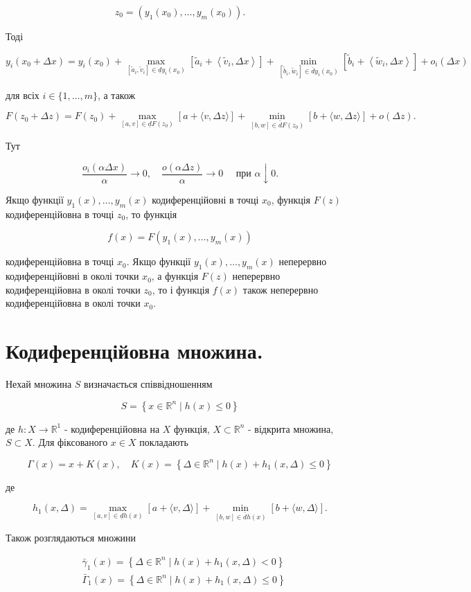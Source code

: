 \documentclass[10pt]{article}
\begin{document}
$$
z_{0}=\left(y_{1}\left(x_{0}\right), \ldots, y_{m}\left(x_{0}\right)\right) .
$$

Тоді

$$
y_{i}\left(x_{0}+\Delta x\right)=y_{i}\left(x_{0}\right)+\max _{\left[\widetilde{a}_{i}, \widetilde{v}_{i}\right] \in \underline{d} y_{i}\left(x_{0}\right)}\left[\widetilde{a}_{i}+\left\langle\widetilde{v}_{i}, \Delta x\right\rangle\right]+\min _{\left[\widetilde{b}_{i}, \widetilde{w}_{i}\right] \in \bar{d} y_{i}\left(x_{0}\right)}\left[\widetilde{b}_{i}+\left\langle\widetilde{w}_{i}, \Delta x\right\rangle\right]+o_{i}(\Delta x)
$$

для всіх $i \in\{1, \ldots, m\}$, а також

$$
F\left(z_{0}+\Delta z\right)=F\left(z_{0}\right)+\max _{[a, v] \in \underline{d} F\left(z_{0}\right)}[a+\langle v, \Delta z\rangle]+\min _{[b, w] \in \bar{d} F\left(z_{0}\right)}[b+\langle w, \Delta z\rangle]+o(\Delta z) .
$$

Тут

$$
\frac{o_{i}(\alpha \Delta x)}{\alpha} \rightarrow 0, \quad \frac{o(\alpha \Delta z)}{\alpha} \rightarrow 0 \quad \text { при } \alpha \downarrow 0 .
$$

Якщо функції $y_{1}(x), \ldots, y_{m}(x)$ кодиференційовні в точці $x_{0}$, функція $F(z)$ кодиференційовна в точці $z_{0}$, то функція

$$
f(x)=F\left(y_{1}(x), \ldots, y_{m}(x)\right)
$$

кодиференційовна в точці $x_{0}$. Якщо функції $y_{1}(x), \ldots, y_{m}(x)$ неперервно кодиференційовні в околі точки $x_{0}$, а функція $F(z)$ неперервно кодиференційовна в околі точки $z_{0}$, то і функція $f(x)$ також неперервно кодиференційовна в околі точки $x_{0}$.

\section*{Кодиференційовна множина.}
Нехай множина $S$ визначається співвідношенням

$$
S=\left\{x \in \mathbb{R}^{n} \mid h(x) \leq 0\right\}
$$

де $h: X \rightarrow \mathbb{R}^{1}$ - кодиференційовна на $X$ функція, $X \subset \mathbb{R}^{n}$ - відкрита множина, $S \subset X$. Для фіксованого $x \in X$ покладають

$$
\Gamma(x)=x+K(x), \quad K(x)=\left\{\Delta \in \mathbb{R}^{n} \mid h(x)+h_{1}(x, \Delta) \leq 0\right\}
$$

де

$$
h_{1}(x, \Delta)=\max _{[a, v] \in \underline{d} h(x)}[a+\langle v, \Delta\rangle]+\min _{[b, w] \in \bar{d} h(x)}[b+\langle w, \Delta\rangle] .
$$

Також розглядаються множини

$$
\begin{aligned}
& \bar{\gamma}_{1}(x)=\left\{\Delta \in \mathbb{R}^{n} \mid h(x)+h_{1}(x, \Delta)<0\right\} \\
& \bar{\Gamma}_{1}(x)=\left\{\Delta \in \mathbb{R}^{n} \mid h(x)+h_{1}(x, \Delta) \leq 0\right\}
\end{aligned}
$$
\end{document}
